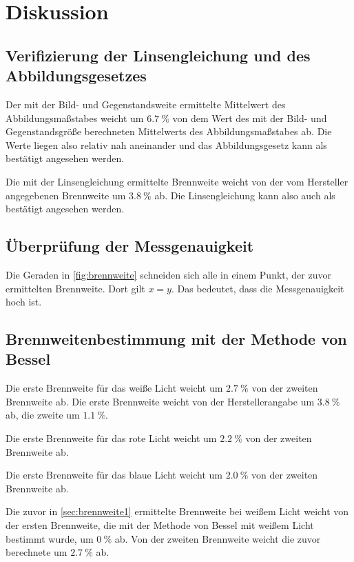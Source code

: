 \section{Diskussion}
\label{sec:Diskussion}

\subsection{Verifizierung der Linsengleichung und des Abbildungsgesetzes}
Der mit der Bild- und Gegenstandsweite ermittelte Mittelwert des Abbildungsmaßstabes weicht um $\SI{6.7}{\percent}$ von dem Wert des mit der Bild- und Gegenstandsgröße berechneten Mittelwerts des Abbildungsmaßstabes ab.
Die Werte liegen also relativ nah aneinander und das Abbildungsgesetz kann als bestätigt angesehen werden.

\noindent Die mit der Linsengleichung ermittelte Brennweite weicht von der vom Hersteller angegebenen Brennweite um $\SI{3.8}{\percent}$ ab. Die Linsengleichung kann also auch als bestätigt angesehen werden.

\subsection{Überprüfung der Messgenauigkeit}
Die Geraden in \ref{fig:brennweite} schneiden sich alle in einem Punkt, der zuvor ermittelten Brennweite.
Dort gilt $x = y$.
Das bedeutet, dass die Messgenauigkeit hoch ist.

\subsection{Brennweitenbestimmung mit der Methode von Bessel}
Die erste Brennweite für das weiße Licht weicht um $\SI{2.7}{\percent}$ von der zweiten Brennweite ab.
Die erste Brennweite weicht von der Herstellerangabe um $\SI{3.8}{\percent}$ ab, die zweite um $\SI{1.1}{\percent}$.

\noindent Die erste Brennweite für das rote Licht weicht um $\SI{2.2}{\percent}$ von der zweiten Brennweite ab.

\noindent Die erste Brennweite für das blaue Licht weicht um $\SI{2.0}{\percent}$ von der zweiten Brennweite ab.

\noindent Die zuvor in \ref{sec:brennweite1} ermittelte Brennweite bei weißem Licht weicht von der ersten Brennweite, die mit der Methode von Bessel mit weißem Licht bestimmt wurde, um $\SI{0}{\percent}$ ab.
\noindent Von der zweiten Brennweite weicht die zuvor berechnete um $\SI{2.7}{\percent}$ ab.

